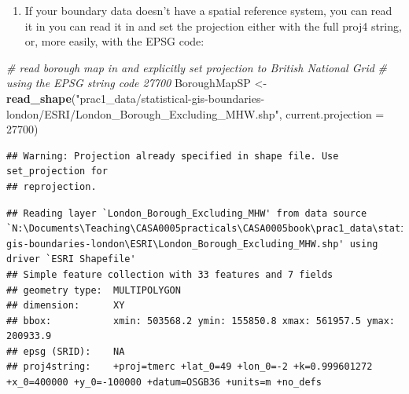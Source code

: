 \documentclass[]{book}
\newenvironment{Shaded}{\begin{snugshade}}{\end{snugshade}}
\newcommand{\CommentTok}[1]{\textcolor[rgb]{0.56,0.35,0.01}{\textit{#1}}}
\newcommand{\DataTypeTok}[1]{\textcolor[rgb]{0.13,0.29,0.53}{#1}}
\newcommand{\DecValTok}[1]{\textcolor[rgb]{0.00,0.00,0.81}{#1}}
\newcommand{\KeywordTok}[1]{\textcolor[rgb]{0.13,0.29,0.53}{\textbf{#1}}}
\newcommand{\NormalTok}[1]{#1}
\newcommand{\OperatorTok}[1]{\textcolor[rgb]{0.81,0.36,0.00}{\textbf{#1}}}
\newcommand{\StringTok}[1]{\textcolor[rgb]{0.31,0.60,0.02}{#1}}
\providecommand{\tightlist}{%
  \setlength{\itemsep}{0pt}\setlength{\parskip}{0pt}}
\begin{document}
\begin{enumerate}
\def\labelenumi{\arabic{enumi}.}
\setcounter{enumi}{25}
\tightlist
\item
  If your boundary data doesn't have a spatial reference system, you can read it in you can read it in and set the projection either with the full proj4 string, or, more easily, with the EPSG code:
\end{enumerate}

\begin{Shaded}
\begin{Highlighting}[]
\CommentTok{# read borough map in and explicitly set projection to British National Grid }
\CommentTok{# using the EPSG string code 27700}
\NormalTok{BoroughMapSP <-}\StringTok{ }\KeywordTok{read_shape}\NormalTok{(}\StringTok{"prac1_data/statistical-gis-boundaries-london/ESRI/London_Borough_Excluding_MHW.shp"}\NormalTok{, }\DataTypeTok{current.projection =} \DecValTok{27700}\NormalTok{)}
\end{Highlighting}
\end{Shaded}

\begin{verbatim}
## Warning: Projection already specified in shape file. Use set_projection for
## reprojection.
\end{verbatim}

\begin{Shaded}
\end{Shaded}

\begin{verbatim}
## Reading layer `London_Borough_Excluding_MHW' from data source `N:\Documents\Teaching\CASA0005practicals\CASA0005book\prac1_data\statistical-gis-boundaries-london\ESRI\London_Borough_Excluding_MHW.shp' using driver `ESRI Shapefile'
## Simple feature collection with 33 features and 7 fields
## geometry type:  MULTIPOLYGON
## dimension:      XY
## bbox:           xmin: 503568.2 ymin: 155850.8 xmax: 561957.5 ymax: 200933.9
## epsg (SRID):    NA
## proj4string:    +proj=tmerc +lat_0=49 +lon_0=-2 +k=0.999601272 +x_0=400000 +y_0=-100000 +datum=OSGB36 +units=m +no_defs
\end{verbatim}
\end{document}
